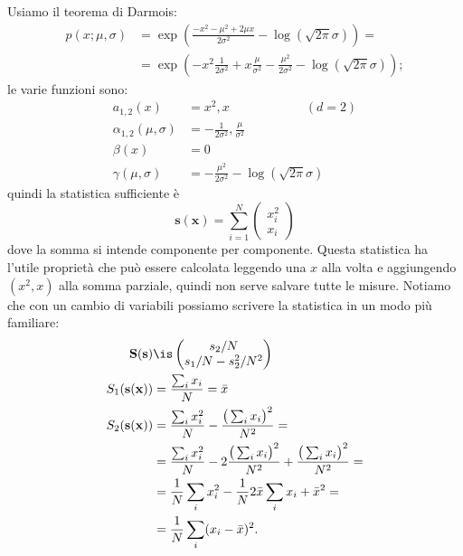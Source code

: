 \begin{solution}
	Usiamo il teorema di Darmois:
	\begin{align*}
		p(x;\mu,\sigma)
		&= \exp \left( \frac{-x^2-\mu^2+2\mu x}{2\sigma^2} - \log(\sqrt{2\pi}\sigma) \right) = \\
		&= \exp \left( -x^2\frac1{2\sigma^2}
		+ x\frac\mu{\sigma^2}
		-\frac{\mu^2}{2\sigma^2} - \log(\sqrt{2\pi}\sigma) \right);
	\end{align*}
	le varie funzioni sono:
	\begin{align*}
		a_{1,2}(x) &= x^2, x \hspace{6em} (d=2)\\
		\alpha_{1,2}(\mu,\sigma) &= -\frac1{2\sigma^2}, \frac\mu{\sigma^2} \\
		\beta(x) &= 0 \\
		\gamma(\mu,\sigma) &= -\frac{\mu^2}{2\sigma^2} - \log(\sqrt{2\pi}\sigma)
	\end{align*}
	quindi la statistica sufficiente è
	\begin{equation*}
		\mathbf s(\mathbf x) = \sum_{i=1}^N \begin{pmatrix} x_i^2 \\ x_i \end{pmatrix}
	\end{equation*}
	dove la somma si intende componente per componente.
	Questa statistica ha l'utile proprietà che può essere calcolata leggendo una $x$ alla volta e aggiungendo $(x^2,x)$ alla somma parziale, quindi non serve salvare tutte le misure.
	Notiamo che con un cambio di variabili possiamo scrivere la statistica in un modo più familiare:
	\begin{align*}
		\mathbf S(\mathbf s)
		&\is \begin{pmatrix}
			s_2 / N \\
			s_1 / N - s_2^2 / N^2
		\end{pmatrix} \\
		S_1(\mathbf s(\mathbf x)) 
		&= \frac{\sum_ix_i}N = \bar x \\
		S_2(\mathbf s(\mathbf x))
		&= \frac{\sum_ix_i^2}N - \frac{\big(\sum_ix_i\big)^2}{N^2} = \\
		&= \frac{\sum_ix_i^2}N - 2\frac{\big(\sum_ix_i\big)^2}{N^2} + \frac{\big(\sum_ix_i\big)^2}{N^2} = \\
		&= \frac1N\sum_ix_i^2 - \frac1N2\bar x\sum_ix_i + \bar x^2 = \\
		&= \frac1N\sum_i(x_i-\bar x)^2.
	\end{align*}
\end{solution}

